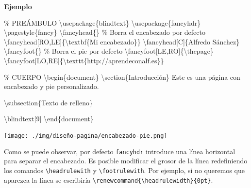 \documentclass[
  a4paper,
]{scrreport}
\newenvironment{Shaded}{\begin{snugshade}}{\end{snugshade}}
\newcommand{\BuiltInTok}[1]{\textcolor[rgb]{0.00,0.23,0.31}{#1}}
\newcommand{\CommentTok}[1]{\textcolor[rgb]{0.37,0.37,0.37}{#1}}
\newcommand{\ExtensionTok}[1]{\textcolor[rgb]{0.00,0.23,0.31}{#1}}
\newcommand{\FunctionTok}[1]{\textcolor[rgb]{0.28,0.35,0.67}{#1}}
\newcommand{\KeywordTok}[1]{\textcolor[rgb]{0.00,0.23,0.31}{#1}}
\newcommand{\NormalTok}[1]{\textcolor[rgb]{0.00,0.23,0.31}{#1}}
\begin{document}
\textbf{Ejemplo}

\begin{Shaded}
\begin{Highlighting}[]
\CommentTok{\% PREÁMBULO}
\BuiltInTok{\textbackslash{}usepackage}\NormalTok{\{}\ExtensionTok{blindtext}\NormalTok{\}}
\BuiltInTok{\textbackslash{}usepackage}\NormalTok{\{}\ExtensionTok{fancyhdr}\NormalTok{\}}
\FunctionTok{\textbackslash{}pagestyle}\NormalTok{\{fancy\}}
\FunctionTok{\textbackslash{}fancyhead}\NormalTok{\{\} }\CommentTok{\% Borra el encabezado por defecto}
\FunctionTok{\textbackslash{}fancyhead}\NormalTok{[RO,LE]\{}\FunctionTok{\textbackslash{}textbf}\NormalTok{\{Mi encabezado\}\}}
\FunctionTok{\textbackslash{}fancyhead}\NormalTok{[C]\{Alfredo Sánchez\}}
\FunctionTok{\textbackslash{}fancyfoot}\NormalTok{\{\} }\CommentTok{\% Borra el pie por defecto}
\FunctionTok{\textbackslash{}fancyfoot}\NormalTok{[LE,RO]\{}\FunctionTok{\textbackslash{}thepage}\NormalTok{\}}
\FunctionTok{\textbackslash{}fancyfoot}\NormalTok{[LO,RE]\{}\FunctionTok{\textbackslash{}texttt}\NormalTok{\{http://aprendeconalf.es\}\}}

\CommentTok{\% CUERPO}
\KeywordTok{\textbackslash{}begin}\NormalTok{\{}\ExtensionTok{document}\NormalTok{\}}
\KeywordTok{\textbackslash{}section}\NormalTok{\{Introducción\}}
\NormalTok{Este es una página con encabezado y pie personalizado.}

\KeywordTok{\textbackslash{}subsection}\NormalTok{\{Texto de relleno\}}

\FunctionTok{\textbackslash{}blindtext}\NormalTok{[9]}
\KeywordTok{\textbackslash{}end}\NormalTok{\{}\ExtensionTok{document}\NormalTok{\}}
\end{Highlighting}
\end{Shaded}

\begin{tcolorbox}[enhanced jigsaw, bottomrule=.15mm, leftrule=.75mm, opacityback=0, titlerule=0mm, bottomtitle=1mm, colbacktitle=quarto-callout-note-color!10!white, arc=.35mm, toprule=.15mm, colframe=quarto-callout-note-color-frame, title={Salida}, coltitle=black, colback=white, breakable, toptitle=1mm, rightrule=.15mm, left=2mm, opacitybacktitle=0.6]

\texttt{[image: ./img/diseño-pagina/encabezado-pie.png]}

\end{tcolorbox}

Como se puede observar, por defecto \texttt{fancyhdr} introduce una
línea horizontal para separar el encabezado. Es posible modificar el
grosor de la línea redefiniendo los comandos
\texttt{\textbackslash{}headrulewith} y
\texttt{\textbackslash{}footrulewith}. Por ejemplo, si no queremos que
aparezca la línea se escribiría
\texttt{\textbackslash{}renewcommand\{\textbackslash{}headrulewidth\}\{0pt\}}.
\end{document}
